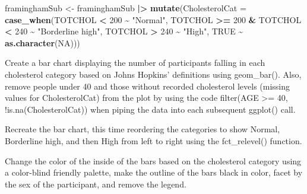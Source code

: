 \documentclass[
]{article}
\newenvironment{Shaded}{\begin{snugshade}}{\end{snugshade}}
\newcommand{\AttributeTok}[1]{\textcolor[rgb]{0.13,0.29,0.53}{#1}}
\newcommand{\ConstantTok}[1]{\textcolor[rgb]{0.56,0.35,0.01}{#1}}
\newcommand{\DecValTok}[1]{\textcolor[rgb]{0.00,0.00,0.81}{#1}}
\newcommand{\FunctionTok}[1]{\textcolor[rgb]{0.13,0.29,0.53}{\textbf{#1}}}
\newcommand{\NormalTok}[1]{#1}
\newcommand{\OtherTok}[1]{\textcolor[rgb]{0.56,0.35,0.01}{#1}}
\newcommand{\SpecialCharTok}[1]{\textcolor[rgb]{0.81,0.36,0.00}{\textbf{#1}}}
\newcommand{\StringTok}[1]{\textcolor[rgb]{0.31,0.60,0.02}{#1}}
\begin{document}
\begin{Shaded}
\begin{Highlighting}[]
\NormalTok{framinghamSub }\OtherTok{\textless{}{-}}\NormalTok{ framinghamSub }\SpecialCharTok{|\textgreater{}} 
  \FunctionTok{mutate}\NormalTok{(}\AttributeTok{CholesterolCat =} \FunctionTok{case\_when}\NormalTok{(TOTCHOL }\SpecialCharTok{\textless{}} \DecValTok{200} \SpecialCharTok{\textasciitilde{}} \StringTok{"Normal"}\NormalTok{,}
\NormalTok{                                    TOTCHOL }\SpecialCharTok{\textgreater{}=} \DecValTok{200} \SpecialCharTok{\&}\NormalTok{  TOTCHOL }\SpecialCharTok{\textless{}} \DecValTok{240} \SpecialCharTok{\textasciitilde{}} \StringTok{"Borderline high"}\NormalTok{,}
\NormalTok{                                    TOTCHOL }\SpecialCharTok{\textgreater{}} \DecValTok{240} \SpecialCharTok{\textasciitilde{}} \StringTok{"High"}\NormalTok{,}
                         \ConstantTok{TRUE} \SpecialCharTok{\textasciitilde{}} \FunctionTok{as.character}\NormalTok{(}\ConstantTok{NA}\NormalTok{)))}
\end{Highlighting}
\end{Shaded}

Create a bar chart displaying the number of participants falling in each
cholesterol category based on Johns Hopkins' definitions using
geom\_bar(). Also, remove people under 40 and those without recorded
cholesterol levels (missing values for CholesterolCat) from the plot by
using the code filter(AGE \textgreater= 40, !is.na(CholesterolCat)) when
piping the data into each subsequent ggplot() call.

Recreate the bar chart, this time reordering the categories to show
Normal, Borderline high, and then High from left to right using the
fct\_relevel() function.

Change the color of the inside of the bars based on the cholesterol
category using a color-blind friendly palette, make the outline of the
bars black in color, facet by the sex of the participant, and remove the
legend.
\end{document}
